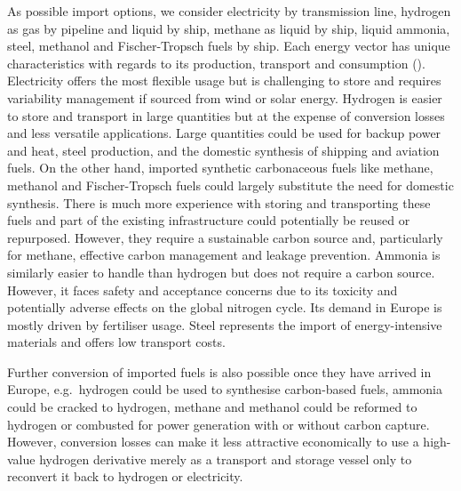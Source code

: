 

As possible import options, we consider electricity by transmission line,
hydrogen as gas by pipeline and liquid by ship, methane as liquid by ship,
liquid ammonia, steel, methanol and Fischer-Tropsch fuels by ship. Each energy
vector has unique characteristics with regards to its production, transport and
consumption (). Electricity offers
the most flexible usage but is challenging to store and requires variability
management if sourced from wind or solar energy. Hydrogen is easier to store and
transport in large quantities but at the expense of conversion losses and less
versatile applications. Large quantities could be used for backup power and
heat, steel production, and the domestic synthesis of shipping and aviation
fuels. On the other hand, imported synthetic carbonaceous fuels like methane,
methanol and Fischer-Tropsch fuels could largely substitute the need for
domestic synthesis. There is much more experience with storing and transporting
these fuels and part of the existing infrastructure could potentially be reused
or repurposed. However, they require a sustainable carbon source and,
particularly for methane, effective carbon management and leakage
prevention.\cite{shirizadehImpactMethaneLeakage2023} Ammonia is similarly easier
to handle than hydrogen but does not require a carbon source. However, it faces
safety and acceptance concerns due to its toxicity and potentially adverse
effects on the global nitrogen
cycle.\cite{bertagniMinimizingImpactsAmmonia2023,wolframUsingAmmoniaShipping2022}
Its demand in Europe is mostly driven by fertiliser usage. Steel represents the
import of energy-intensive materials and offers low transport costs.

Further conversion of imported fuels is also possible once they have arrived in
Europe, e.g.~hydrogen could be used to synthesise carbon-based fuels, ammonia
could be cracked to hydrogen, methane and methanol could be reformed to hydrogen
or combusted for power generation with or without carbon capture. However,
conversion losses can make it less attractive economically to use a high-value
hydrogen derivative merely as a transport and storage vessel only to reconvert
it back to hydrogen or electricity.


